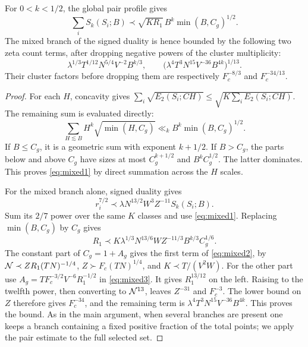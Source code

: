 \begin{proposition}
For $0<k<1/2$, the global pair profile \cite[(\ref*{p-eq:pairbound})]{Thin} gives
\begin{equation}
 \sum_i S_k(S_i;B)
 \prec \sqrt{KR_1}\,B^k\min(B,C_g)^{1/2}.
 \label{eq:mixed1}
\end{equation}
The mixed branch of the signed duality is hence bounded by the
following two zeta count terms, after dropping negative powers of
the cluster multiplicity:
\begin{equation}
 \lambda^{1/3}T^{1/12}N^{5/4}V^{-2}B^{k/3},
 \qquad
 \bigl(\lambda^4T^3N^{15}V^{-36}B^{4k}\bigr)^{1/13}.
 \label{eq:mixed2}
\end{equation}
Their cluster factors before dropping them are respectively
$F_c^{-8/3}$ and $F_c^{-34/13}$.
\end{proposition}
\begin{proof}
For each $H$, concavity gives
$\sum_i\sqrt{E_2(S_i;CH)}\le\sqrt{K\sum_iE_2(S_i;CH)}$.
The remaining sum is evaluated directly:
\[
 \sum_{H\lesssim B}H^k\sqrt{\min(H,C_g)}
 \ll_k B^k\min(B,C_g)^{1/2}.
\]
If $B\le C_g$, it is a geometric sum with exponent $k+1/2$.
If $B>C_g$, the parts below and above $C_g$ have sizes at most
$C_g^{k+1/2}$ and $B^k C_g^{1/2}$. The latter dominates.
This proves \eqref{eq:mixed1} by direct summation across the $H$ scales.

For the mixed branch alone, signed duality gives
\[
 r_i^{7/2}\prec\lambda N^{13/2}W^3Z^{-11}S_k(S_i;B).
\]
Sum its $2/7$ power over the same $K$ classes and use \eqref{eq:mixed1}.
Replacing $\min(B,C_g)$ by $C_g$ gives
\begin{equation}
 R_1\prec K\lambda^{1/3}N^{13/6}WZ^{-11/3}
                     B^{k/3}C_g^{1/6}.
 \label{eq:mixed3}
\end{equation}
The constant part of $C_g=1+A_g$ gives the first term of \eqref{eq:mixed2}, by
$\mathcal{N}\prec ZR_1(TN)^{-1/4}$,
$Z\succ F_c(TN)^{1/4}$, and $K\prec T/(V^2W)$.
For the other part use
$A_g=T F_c^{-3/2}V^{-6}R_1^{-1/2}$ in \eqref{eq:mixed3}.
It gives $R_1^{13/12}$ on the left. Raising to the twelfth power,
then converting to $\mathcal{N}^{13}$, leaves $Z^{-31}$ and $F_c^{-3}$.
The lower bound on $Z$ therefore gives $F_c^{-34}$, and the remaining
term is $\lambda^4T^3N^{15}V^{-36}B^{4k}$. This proves the bound.
As in the main argument, when several branches are present one keeps
a branch containing a fixed positive fraction of the total points;
we apply the pair estimate to the full selected set.
\end{proof}

